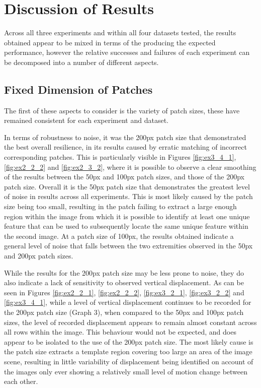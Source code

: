 \clearpage
\section{Discussion of Results}

Across all three experiments and within all four datasets tested, the results obtained appear to be mixed in terms of the producing the expected performance, however the relative successes and failures of each experiment can be decomposed into a number of different aspects.

\subsection{Fixed Dimension of Patches}

The first of these aspects to consider is the variety of patch sizes, these have remained consistent for each experiment and dataset. 

In terms of robustness to noise, it was the 200px patch size that demonstrated the best overall resilience, in its results caused by erratic matching of incorrect corresponding patches. This is particularly visible in Figures \ref{fig:ex3_4_1}, \ref{fig:ex2_2_2} and \ref{fig:ex2_3_2}, where it is possible to observe a clear smoothing of the results between the 50px and 100px patch sizes, and those of the 200px patch size. Overall it is the 50px patch size that demonstrates the greatest level of noise in results across all experiments. This is most likely caused by the patch size being too small, resulting in the patch failing to extract a large enough region within the image from which it is possible to identify at least one unique feature that can be used to subsequently locate the same unique feature within the second image. At a patch size of 100px, the results obtained indicate a general level of noise that falls between the two extremities observed in the 50px and 200px patch sizes. 

While the results for the 200px patch size may be less prone to noise, they do also indicate a lack of sensitivity to observed vertical displacement. As can be seen in Figures \ref{fig:ex2_2_1}, \ref{fig:ex2_2_2}, \ref{fig:ex3_2_1}, \ref{fig:ex3_2_2} and \ref{fig:ex3_4_1}, while a level of vertical displacement continues to be recorded for the 200px patch size (Graph 3), when compared to the 50px and 100px patch sizes, the level of recorded displacement appears to remain almost constant across all rows within the image. This behaviour would not be expected, and does appear to be isolated to the use of the 200px patch size. The most likely cause is the patch size extracts a template region covering too large an area of the image scene, resulting in little variability of displacement being identified on account of the images only ever showing a relatively small level of motion change between each other. 

